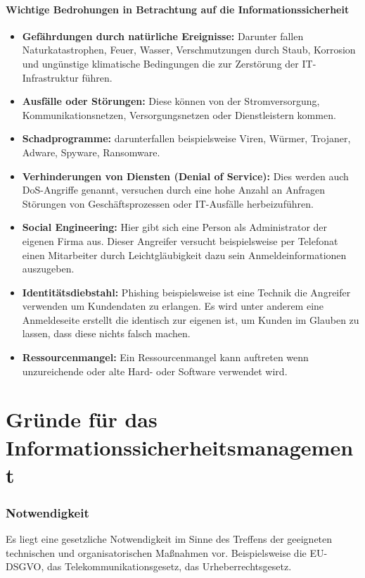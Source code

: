 \paragraph{Wichtige Bedrohungen in Betrachtung auf die Informationssicherheit}
\begin{itemize}
	\item \textbf{Gefährdungen durch natürliche Ereignisse:} Darunter fallen Naturkatastrophen, Feuer, Wasser, Verschmutzungen durch Staub, Korrosion und ungünstige klimatische Bedingungen die zur Zerstörung der IT-Infrastruktur führen.
	\item \textbf{Ausfälle oder Störungen:} Diese können von der Stromversorgung, Kommunikationsnetzen, Versorgungsnetzen oder Dienstleistern kommen.
	\item \textbf{Schadprogramme:} darunterfallen beispielsweise Viren, Würmer, Trojaner, Adware, Spyware, Ransomware.
	\item \textbf{Verhinderungen von Diensten (Denial of Service):} Dies werden auch DoS-Angriffe genannt, versuchen durch eine hohe Anzahl an Anfragen Störungen von Geschäftsprozessen oder IT-Ausfälle herbeizuführen.
	\item \textbf{Social Engineering:} Hier gibt sich eine Person als Administrator der eigenen Firma aus. Dieser Angreifer versucht beispielsweise per Telefonat einen Mitarbeiter durch Leichtgläubigkeit dazu  sein Anmeldeinformationen auszugeben.
	\item \textbf{Identitätsdiebstahl:} Phishing beispielsweise ist eine Technik die Angreifer verwenden um Kundendaten zu erlangen. Es wird unter anderem eine Anmeldeseite erstellt die identisch zur eigenen ist, um Kunden im Glauben zu lassen, dass diese nichts falsch machen.
	\item \textbf{Ressourcenmangel:} Ein Ressourcenmangel kann auftreten wenn unzureichende oder alte Hard- oder Software verwendet wird. 
\end{itemize}

\section{Gründe für das Informationssicherheitsmanagement}
\subsubsection{Notwendigkeit}
Es liegt eine gesetzliche Notwendigkeit im Sinne des Treffens der geeigneten technischen und organisatorischen Maßnahmen vor. Beispielsweise die EU-DSGVO, das Telekommunikationsgesetz, das Urheberrechtsgesetz.


